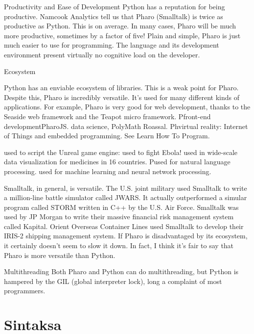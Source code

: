 \documentclass{beamer}
\begin{document}
\begin{frame}{Productivity and Ease of Development}
Python has a reputation for being productive. Namcook Analytics tell us that Pharo (Smalltalk) is twice as productive as Python. This is on average. In many cases, Pharo will be much more productive, sometimes by a factor of five!
Plain and simple, Pharo is just much easier to use for programming. The language and its development environment present virtually no cognitive load on the developer.
\end{frame}
\begin{frame}{Ecosystem}

Python has an enviable ecosystem of libraries. This is a weak point for Pharo. Despite this, Pharo is incredibly versatile. It’s used for many different kinds of applications. For example, Pharo is very good for web development, thanks to the Seaside web framework and the Teapot micro framework.
Pfront-end developmentPharoJS.
data science,  PolyMath  Roassal.
Phvirtual reality:
Internet of Things and embedded programming. See Learn How To Program.

used to script the Unreal game engine:
used to fight Ebola!
used in wide-scale data visualization for medicines in 16 countries.
Pused for natural language processing.
used for machine learning and neural network processing.

Smalltalk, in general, is versatile. The U.S. joint military used Smalltalk to write a million-line battle simulator called JWARS. It actually outperformed a simular program called STORM written in C++ by the U.S. Air Force. 
Smalltalk was used by JP Morgan to write their massive financial risk management system called Kapital.
Orient Overseas Container Lines used Smalltalk to develop their IRIS-2 shipping management system.
If Pharo is disadvantaged by its ecosystem, it certainly doesn’t seem to slow it down. In fact, I think it’s fair to say that Pharo is more versatile than Python.
\end{frame}
\begin{frame}{Multithreading}
Both Pharo and Python can do multithreading, but Python is hampered by the GIL (global interpreter lock), long a complaint of most programmers.
\end{frame}

\section{Sintaksa}
\end{document}
